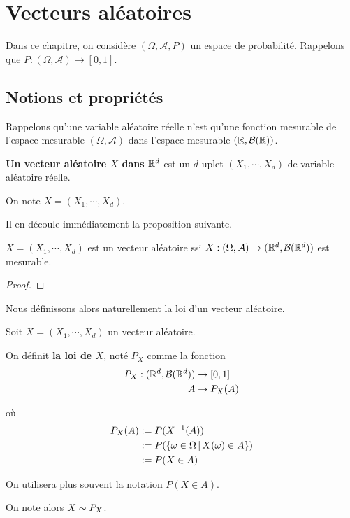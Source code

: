 \chapter{Vecteurs aléatoires}

\label{chapter:vecteurs_aleatoires}

Dans ce chapitre, on considère $(\Omega, \mathcal{A}, P)$ un espace de
probabilité.
Rappelons que $P : (\Omega, \mathcal{A}) \rightarrow [0, 1]$.

\section{Notions et propriétés}

Rappelons qu'une variable aléatoire réelle n'est qu'une fonction mesurable de
l'espace mesurable $(\Omega, \mathcal{A})$ dans l'espace mesurable $(\mathbb{R},
\mathcal{B}(\mathbb{R}))$.

\begin{definition}
	\textbf{Un vecteur aléatoire $X$ dans $\mathbb{R}^{d}$} est un $d$-uplet $(X_{1}, \cdots,
	X_{d})$ de variable aléatoire réelle.

	On note $X = (X_{1}, \cdots, X_{d})$.
\end{definition}

Il en découle immédiatement la proposition suivante.

\begin{proposition}
	$X = (X_{1}, \cdots, X_{d})$ est un vecteur aléatoire ssi $X : (\Omega,
	\mathcal{A}) \rightarrow (\mathbb{R}^{d}, \mathcal{B}(\mathbb{R}^{d}))$ est mesurable.
\end{proposition}

\ifdefined\outputproof
\begin{proof}

\end{proof}

Nous définissons alors naturellement la loi d'un vecteur aléatoire.

\begin{definition}
	Soit $X = (X_{1}, \cdots, X_{d})$ un vecteur aléatoire.

	On définit \textbf{la loi de $X$}, noté $P_{X}$ comme la fonction
	\begin{align}
		P_{X} : (\mathbb{R}^{d}, \mathcal{B}(\mathbb{R}^{d})) &\rightarrow [0, 1] \\
		A &\rightarrow P_{X}(A)
	\end{align}

	où
	\begin{align}
		P_{X}(A) & := P(X^{-1}(A)) \\
		&:= P(\left\{\omega \in \Omega \, | \, X(\omega) \in A \right\}) \\
		& := P(X \in A)
	\end{align}

	On utilisera plus souvent la notation $P(X \in A)$.

	On note alors $X \sim P_{X}$.
\end{definition}


